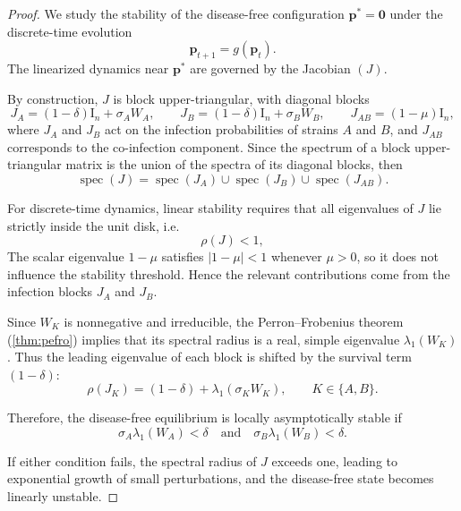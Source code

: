 \documentclass[10pt,a4paper]{amsart}
\begin{document}
\begin{proof}

We study the stability of the disease-free configuration 
\(\mathbf{p}^* = \mathbf{0}\) 
under the discrete-time evolution
\[
\mathbf{p}_{t+1} = g(\mathbf{p}_t).
\]
The linearized dynamics near $\mathbf{p}^*$ are governed by the Jacobian $(J)$. 

By construction, $J$ is block upper-triangular, with diagonal blocks
\[
J_A = (1-\delta) \mathrm{I}_n + \sigma_{A} W_A, 
\qquad
J_B = (1-\delta) \mathrm{I}_n + \sigma_{B} W_B,
\qquad
J_{AB} = (1-\mu)\mathrm{I}_n,
\]
where $J_A$ and $J_B$ act on the infection probabilities of strains $A$ and $B$, and $J_{AB}$ corresponds to the co-infection component. Since the spectrum of a block upper-triangular matrix is the union of the spectra of its diagonal blocks, then
\[
\operatorname{spec}(J) = \operatorname{spec}(J_A) \cup \operatorname{spec}(J_B) \cup \operatorname{spec}(J_{AB}) .
\]

For discrete-time dynamics, linear stability requires that all eigenvalues of $J$ lie strictly inside the unit disk, i.e.
\[
\rho(J) < 1,
\]
The scalar eigenvalue $1-\mu$ satisfies $|1-\mu| < 1$ whenever $\mu>0$, so it does not influence the stability threshold. Hence the relevant contributions come from the infection blocks $J_A$ and $J_B$.

Since $W_K$ is nonnegative and irreducible, the Perron--Frobenius theorem (\ref{thm:pefro}) implies that its spectral radius is a real, simple eigenvalue $\lambda_{1}(W_K)$. Thus the leading eigenvalue of each block is shifted by the survival term $(1-\delta)$:
\[
\rho(J_K) = (1-\delta) + \lambda_{1}(\sigma_{K} W_K), \qquad K \in \{A,B\}.
\]

Therefore, the disease-free equilibrium is locally asymptotically stable if 
\[
\sigma_{A} \lambda_{1}(W_A) < \delta
\quad \text{and} \quad
\sigma_{B} \lambda_{1}(W_B) < \delta.
\]

If either condition fails, the spectral radius of $J$ exceeds one, leading to exponential growth of small perturbations, and the disease-free state becomes linearly unstable.
\end{proof}
\end{document}
